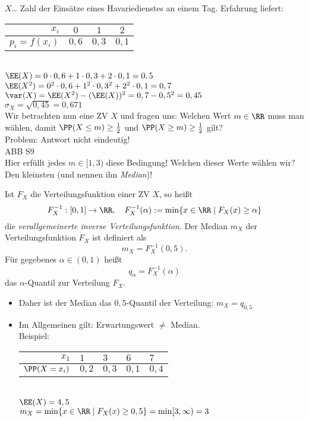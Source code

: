  $X$… Zahl der Einsätze eines Havariedienstes an einem Tag. Erfahrung liefert: \\
\begin{tabular}{r | c c c}
$x_i$ & $0$ & $1$ & $2$\\\hline
$p_i=f(x_i)$ & $0,6$ & $0,3$ & $0,1$
\end{tabular}\medskip\\
$\EE(X)=0\cdot 0,6 + 1 \cdot 0,3 + 2 \cdot 0,1 = 0,5$\\
$\EE(X^2) = 0^2 \cdot 0,6  + 1^2 \cdot 0,3^2 + 2^2 \cdot 0,1 = 0,7$\\
$\var(X)=\EE(X^2) - (\EE(X))^2 = 0,7-0,5^2 = 0,45$\\
$\sigma_X= \sqrt{0,45}=0,671$\bigskip\\
Wir betrachten nun eine ZV $X$ und fragen uns: Welchen Wert $m\in \RR$ muss man wählen, damit $\PP(X\leq m)\geq \frac{1}{2}$ und $\PP(X\geq m) \geq \frac{1}{2}$ gilt?\\
Problem: Antwort nicht eindeutig!\\
ABB S9\\
Hier erfüllt jedes $m\in [1,3)$ diese Bedingung! Welchen dieser Werte wählen wir? Den kleinsten (und nennen ihn \emph{Median})!

 Ist $F_X$ die Verteilungsfunktion einer ZV $X$, so heißt
$$F_X^{-1}: [0,1]\to \RR, \quad F_X^{-1}(\alpha):= \min\{x\in\RR\;|\; F_X(x) \geq \alpha \}$$
die \emph{verallgemeinerte inverse Verteilungsfunktion}. Der Median $m_X$ der Verteilungsfunktion $F_X$ ist definiert als
$$m_X = F_X^{-1}(0,5)\text{.}$$
Für gegebenes $\alpha \in (0,1)$ heißt
$$q_\alpha = F_X^{-1}(\alpha)$$
das $\alpha$-Quantil zur Verteilung $F_X$.

\begin{itemize}
\item Daher ist der Median das $0,5$-Quantil der Verteilung: $m_X=q_{0,5}$
\item Im Allgemeinen gilt: Erwartungswert $\not =$ Median.\\
Beispiel:\\
\begin{tabular}{r | l l l l}
$x_1$ & $1$ & $3$ & $6$ & $7$\\\hline
$\PP(X=x_i)$ & $0,2$ & $0,3$ & $0,1$ & $0,4$
\end{tabular}\\
$\EE(X)=4,5$\\
$m_X=\min\{x\in \RR \;|\; F_X(x) \geq 0,5\}= \min[3,\infty) = 3$
\end{itemize}

